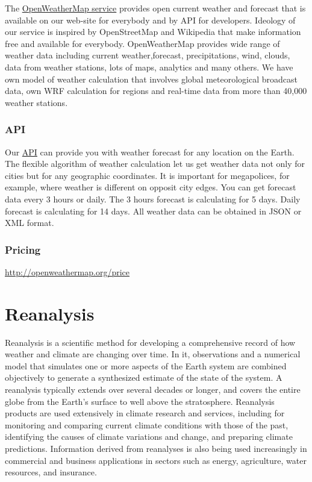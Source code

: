\documentclass[11pt]{article}
\begin{document}
The \href{http://openweathermap.org/}{OpenWeatherMap service} provides open current weather and forecast
that is available on our web-site for everybody and by API for
developers. Ideology of our service is inspired by OpenStreetMap and
Wikipedia that make information free and available for
everybody. OpenWeatherMap provides wide range of weather data
including current weather,forecast, precipitations, wind, clouds, data
from weather stations, lots of maps, analytics and many others. We
have own model of weather calculation that involves global
meteorological broadcast data, own WRF calculation for regions and
real-time data from more than 40,000 weather stations.

\subsubsection{API}
\label{sec-2-7-1}

Our \href{http://openweathermap.org/forecast}{API} can provide you with weather forecast for any location on the
Earth. The flexible algorithm of weather calculation let us get
weather data not only for cities but for any geographic
coordinates. It is important for megapolices, for example, where
weather is different on opposit city edges. You can get forecast data
every 3 hours or daily. The 3 hours forecast is calculating for 5
days. Daily forecast is calculating for 14 days. All weather data can
be obtained in JSON or XML format.
\subsubsection{Pricing}
\label{sec-2-7-2}
\url{http://openweathermap.org/price}

\section{Reanalysis}
\label{sec-3}
Reanalysis is a scientific method for developing a comprehensive
record of how weather and climate are changing over time. In it,
observations and a numerical model that simulates one or more
aspects of the Earth system are combined objectively to generate a
synthesized estimate of the state of the system. A reanalysis
typically extends over several decades or longer, and covers the
entire globe from the Earth’s surface to well above the
stratosphere. Reanalysis products are used extensively in climate
research and services, including for monitoring and comparing
current climate conditions with those of the past, identifying the
causes of climate variations and change, and preparing climate
predictions. Information derived from reanalyses is also being
used increasingly in commercial and business applications in
sectors such as energy, agriculture, water resources, and
insurance.
\end{document}
